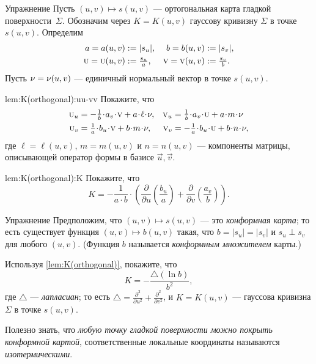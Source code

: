 \begin{thm}{Упражнение}\label{lem:K(orthogonal)}
Пусть $(u,v)\mapsto s(u,v)$ --- ортогональная карта гладкой поверхности~$\Sigma$.
Обозначим через $K=K(u,v)$ гауссову кривизну $\Sigma$ в точке $s(u,v)$.
Определим 
\begin{align*}
a=a(u,v)&\mathrel{:=}|s_u|,&
b=b(u,v)&\mathrel{:=}|s_v|,\\
\text{\sc{u}}=\text{\sc{u}}(u,v)&\mathrel{:=}\tfrac{s_u}a,&
\text{\sc{v}}=\text{\sc{v}}(u,v)&\mathrel{:=}\tfrac{s_v}b.
\end{align*}
Пусть $\nu=\nu(u,v)$ --- единичный нормальный вектор в точке $s(u,v)$.

\begin{subthm}{lem:K(orthogonal):uu-vv}
Покажите, что 
\begin{align*}
\vec u_u
&=
-\tfrac1{b}\cdot a_v
\cdot
\vec v 
+
a\cdot \ell\cdot \Norm
,
&
\vec v_u
&=
\tfrac1{b}\cdot a_v
\cdot \vec u
+
a\cdot m\cdot \Norm
\\
\vec u_v
&=
\tfrac1{a}\cdot b_u\cdot\vec v
+
b\cdot m\cdot \Norm
,
&
\vec v_v
&=
-\tfrac1{a}\cdot b_u\cdot\vec u
+
b\cdot n\cdot \Norm,
\end{align*}
где $\ell=\ell(u,v)$, $m=m(u,v)$ и $n=n(u,v)$ --- компоненты матрицы, описывающей оператор формы в базисе $\vec u, \vec v$.
\end{subthm}

\begin{subthm}{lem:K(orthogonal):K}
Покажите, что
\[K=-\frac1{a\cdot b}\cdot
\left(
\frac{\partial}{\partial u}
\left(\frac{b_u}a \right)
+
\frac{\partial}{\partial v}
\left(\frac{a_v}b\right)
\right).\]
\end{subthm}
\end{thm}

\begin{thm}{Упражнение}\label{ex:conformal}
Предположим, что $(u,v)\mapsto s(u,v)$ --- это \emph{конформная карта};
то есть существует функция $(u,v)\mapsto b(u,v)$ такая, что $b=|s_u|=|s_v|$ и $s_u\perp s_v$ для любого $(u,v)$.
(Функция $b$ называется {}\emph{конформным множителем} карты.)

Используя \ref{lem:K(orthogonal)}, покажите, что  
\[K=-\frac{\triangle (\ln b)}{b^2},\]
где $\triangle$ --- \emph{лапласиан}; то есть $\triangle=\tfrac{\partial^2}{\partial u^2}+\tfrac{\partial^2}{\partial v^2}$, и 
 $K=K(u,v)$ --- гауссова кривизна $\Sigma$ в точке $s(u,v)$.
\end{thm}

Полезно знать, что \textit{любую точку гладкой поверхности можно покрыть конформной картой},
соответственные локальные координаты называются \emph{изотермическими}.

